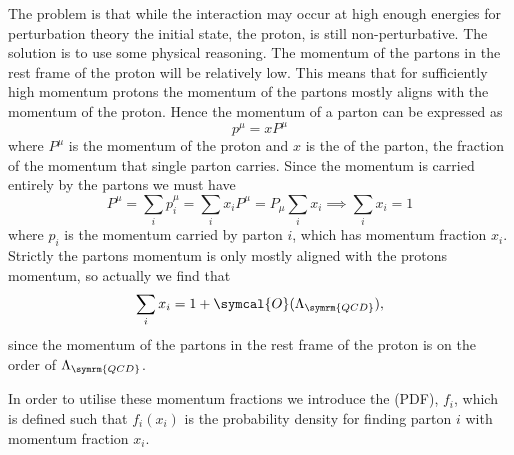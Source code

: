 \documentclass[fleqn]{NotesClass}
\newcommand{\order}{\symcal{O}}
\begin{document}
    The problem is that while the interaction may occur at high enough energies for perturbation theory the initial state, the proton, is still non-perturbative.
    The solution is to use some physical reasoning.
    The momentum of the partons in the rest frame of the proton will be relatively low.
    This means that for sufficiently high momentum protons the momentum of the partons mostly aligns with the momentum of the proton.
    Hence the momentum of a parton can be expressed as
    \begin{equation}
        p^\mu = xP^\mu
    \end{equation}
    where \(P^\mu\) is the momentum of the proton and \(x\) is the  of the parton, the fraction of the momentum that single parton carries.
    Since the momentum is carried entirely by the partons we must have
    \begin{equation}
        P^\mu = \sum_i p_i^\mu = \sum_i x_iP^\mu = P_\mu \sum_i x_i \implies \sum_i x_i = 1
    \end{equation}
    where \(p_i\) is the momentum carried by parton \(i\), which has momentum fraction \(x_i\).
    Strictly the partons momentum is only mostly aligned with the protons momentum, so actually we find that
    \begin{equation}
        \sum_i x_i = 1 + \order(\Lambda_{\symrm{QCD}}),
    \end{equation}
    since the momentum of the partons in the rest frame of the proton is on the order of \(\Lambda_{\symrm{QCD}}\).
    
    In order to utilise these momentum fractions we introduce the  (PDF), \(f_i\), which is defined such that \(f_i(x_i)\) is the probability density for finding parton \(i\) with momentum fraction \(x_i\).
    
\end{document}
